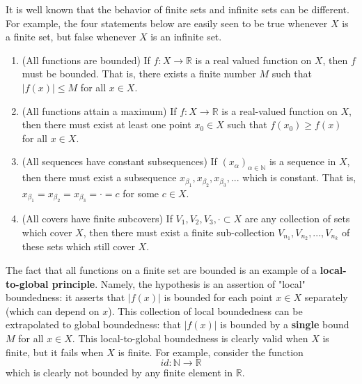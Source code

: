 \documentclass{article}
\begin{document}
    It is well known that the behavior of finite sets and infinite sets can be different. For example, the four statements below are easily seen to be true whenever $X$ is a finite set, but false whenever $X$ is an infinite set. 
    \begin{enumerate}
        \item (All functions are bounded) If $f: X \longrightarrow \mathbb{R}$ is a real valued function on $X$, then $f$ must be bounded. That is, there exists a finite number $M$ such that $|f(x)| \leq M$ for all $x \in X$. 
        \item (All functions attain a maximum) If $f: X \longrightarrow \mathbb{R}$ is a real-valued function on $X$, then there must exist at least one point $x_0 \in X$ such that $f(x_0) \geq f(x)$ for all $x \in X$. 
        \item (All sequences have constant subsequences) If $(x_\alpha)_{\alpha \in \mathbb{N}}$ is a sequence in $X$, then there must exist a subsequence $x_{\beta_1}, x_{\beta_2}, x_{\beta_3}, ...$ which is constant. That is, $x_{\beta_1} = x_{\beta_2} = x_{\beta_3} = \cdot = c$ for some $c \in X$. 
        \item (All covers have finite subcovers) If $V_1, V_2, V_3, \cdot \subset X$ are any collection of sets which cover $X$, then there must exist a finite sub-collection $V_{n_1}, V_{n_2}, ..., V_{n_k}$ of these sets which still cover $X$. 
    \end{enumerate}

    The fact that all functions on a finite set are bounded is an example of a \textbf{local-to-global principle}. Namely, the hypothesis is an assertion of "local" boundedness: it asserts that $|f(x)|$ is bounded for each point $x \in X$ separately (which can depend on $x$). This collection of local boundedness can be extrapolated to global boundedness: that $|f(x)|$ is bounded by a \textbf{single} bound $M$ for all $x \in X$. This local-to-global boundedness is clearly valid when $X$ is finite, but it fails when $X$ is finite. For example, consider the function
    \[id: \mathbb{N} \longrightarrow \mathbb{R}\]
    which is clearly not bounded by any finite element in $\mathbb{R}$. 
\end{document}
